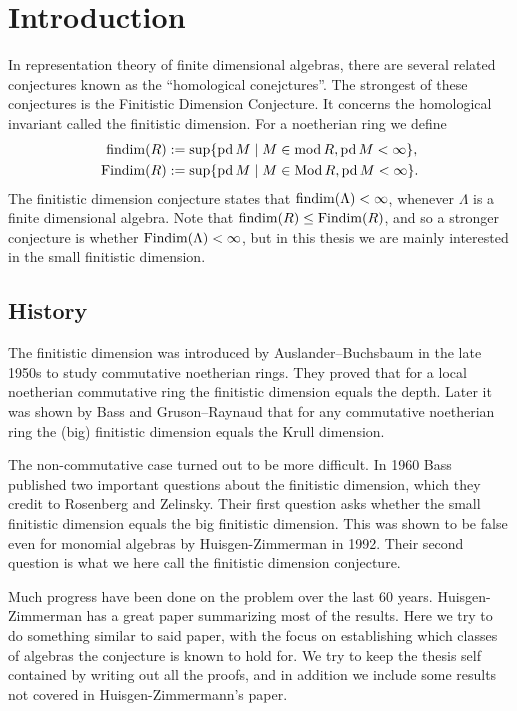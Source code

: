 \section*{Introduction}
%

In representation theory of finite dimensional algebras, there are several related conjectures known as the ``homological conejctures''. The strongest of these conjectures is the Finitistic Dimension Conjecture. It concerns the homological invariant called the finitistic dimension. For a noetherian ring we define
\begin{align*}
  \operatorname{findim}(R) &:= \sup\{\operatorname{pd} M \mid M \in \operatorname{mod} R, \operatorname{pd} M < \infty\},\\
  \operatorname{Findim}(R) &:= \sup\{\operatorname{pd} M \mid M \in \operatorname{Mod} R, \operatorname{pd} M < \infty\}.
\end{align*}
The finitistic dimension conjecture states that $\operatorname{findim}(\Lambda) < \infty$, whenever $\Lambda$ is a finite dimensional algebra. Note that $\operatorname{findim}(R) \leq \operatorname{Findim}(R)$, and so a stronger conjecture is whether $\operatorname{Findim}(\Lambda) < \infty$, but in this thesis we are mainly interested in the small finitistic dimension.

\subsection*{History}

The finitistic dimension was introduced by Auslander--Buchsbaum in the late 1950s to study commutative noetherian rings. They proved that for a local noetherian commutative ring the finitistic dimension equals the depth\cite{AB57}. Later it was shown by Bass and Gruson--Raynaud that for any commutative noetherian ring the (big) finitistic dimension equals the Krull dimension\cite{Bass62,RG71}.

The non-commutative case turned out to be more difficult. In 1960 Bass published two important questions about the finitistic dimension\cite{Bass60}, which they credit to Rosenberg and Zelinsky. Their first question asks whether the small finitistic dimension equals the big finitistic dimension. This was shown to be false even for monomial algebras by Huisgen-Zimmerman in 1992\cite{ZH92}. Their second question is what we here call the finitistic dimension conjecture. 

Much progress have been done on the problem over the last 60 years. Huisgen-Zimmerman has a great paper summarizing most of the results\cite{ZH95}. Here we try to do something similar to said paper, with the focus on establishing which classes of algebras the conjecture is known to hold for. We try to keep the thesis self contained by writing out all the proofs, and in addition we include some results not covered in Huisgen-Zimmermann's paper.

